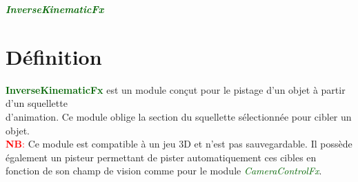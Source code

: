 \documentclass[a4paper, 11pt]{article}
\begin{document}
	\pagecolor{silver}
	\huge{\hspace{12cm}\textit{\textbf{\textcolor{darkgreen}{InverseKinematicFx}}}}\large{} \tableofcontents 
	\newpage
	\section{Définition}
	\textcolor{darkgreen}{\textbf{InverseKinematicFx}} est un module conçut pour le pistage d'un objet à 
	partir d'un squellette \\d'animation. Ce module oblige la section du squellette sélectionnée pour cibler
	un objet.\\
	\textcolor{red}{\textbf{NB}:} Ce module est compatible à un jeu 3D et n'est pas sauvegardable. Il 
	possède également un pisteur permettant de pister automatiquement ces cibles en fonction de son champ de 
	vision comme pour le module \textit{\textcolor{darkgreen}{CameraControlFx}}.

\end{document}
